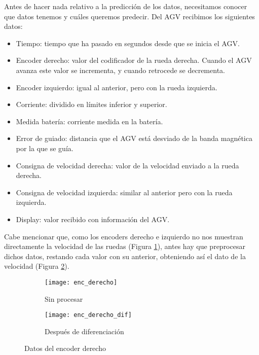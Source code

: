 Antes de hacer nada relativo a la predicción de los datos, necesitamos conocer que datos tenemos y cuáles 
queremos predecir. Del AGV recibimos los siguientes datos:
\begin{itemize}
    \item Tiempo: tiempo que ha pasado en segundos desde que se inicia el AGV.
    \item Encoder derecho: valor del codificador de la rueda derecha. Cuando el AGV avanza este valor se
        incrementa, y cuando retrocede se decrementa.
    \item Encoder izquierdo: igual al anterior, pero con la rueda izquierda.
    \item Corriente: dividido en límites inferior y superior.
    \item Medida batería: corriente medida en la batería.
    \item Error de guiado: distancia que el AGV está desviado de la banda magnética por la que se guía.
    \item Consigna de velocidad derecha: valor de la velocidad enviado a la rueda derecha.
    \item Consigna de velocidad izquierda: similar al anterior pero con la rueda izquierda.
    \item Display: valor recibido con información del AGV.
\end{itemize}

Cabe mencionar que, como los encoders derecho e izquierdo no nos muestran directamente la velocidad de las 
ruedas (Figura \ref{fig:datos_enc_derecho_sp}), antes hay que preprocesar dichos datos, restando cada valor con su anterior, obteniendo así el dato de la 
velocidad (Figura \ref{fig:datos_enc_derecho_dif}).

\begin{figure}[H]
    \centering
    \begin{subfigure}[b]{0.45\textwidth}
        \centering
        \texttt{[image: enc\_derecho]}
        \caption{Sin procesar}
        \label{fig:datos_enc_derecho_sp}
    \end{subfigure}
    \hfill
    \begin{subfigure}[b]{0.45\textwidth}
        \centering
        \texttt{[image: enc\_derecho\_dif]}
        \caption{Después de diferenciación}
        \label{fig:datos_enc_derecho_dif}
    \end{subfigure}
    \caption{Datos del encoder derecho}
    \label{fig:datos_enc_derecho}
\end{figure}

